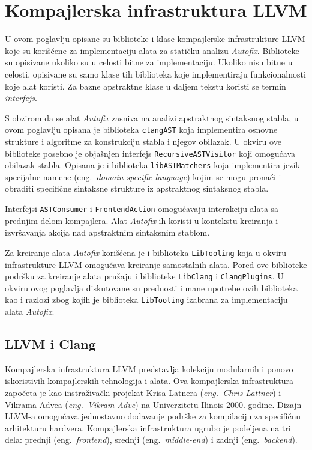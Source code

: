 \documentclass[12pt,oneside]{memoir}
\begin{document}
\chapter{Kompajlerska infrastruktura LLVM}
\label{chp:llvm}

U ovom poglavlju opisane su biblioteke i klase kompajlerske infrastrukture LLVM koje su kori\v{s}\'{c}ene za implementaciju alata za stati\v{c}ku analizu \textit{Autofix}. Biblioteke su opisivane ukoliko su u celosti
bitne za implementaciju. Ukoliko nisu bitne u celosti, opisivane su samo klase tih biblioteka koje implementiraju funkcionalnosti koje alat koristi. Za bazne apstraktne klase u daljem tekstu koristi se termin \textit{interfejs}. \par 
S obzirom da se alat \textit{Autofix} zasniva na analizi apstraktnog sintaksnog stabla, u ovom poglavlju opisana je biblioteka \texttt{clangAST} koja implementira osnovne
strukture i algoritme za konstrukciju stabla i njegov obilazak. U okviru ove biblioteke posebno je obja\v{s}njen interfejs \texttt{RecursiveASTVisitor} koji omogu\'{c}ava obilazak stabla.
Opisana je i biblioteka \texttt{libASTMatchers} koja implementira jezik specijalne namene (eng.~\textit{domain specific language}) kojim se mogu prona\'{c}i i obraditi specifi\v{c}ne sintaksne strukture iz apstraktnog sintaksnog stabla.
\par
Interfejsi \texttt{ASTConsumer} i \texttt{FrontendAction} omogu\'{c}avaju interakciju alata sa prednjim delom kompajlera. Alat \textit{Autofix} ih
koristi u kontekstu kreiranja i izvr\v{s}avanja akcija nad apstraktnim sintaksnim
stablom.
\par
Za kreiranje alata \textit{Autofix} kori\v{s}\'{c}ena je i biblioteka \texttt{LibTooling} koja u okviru infrastrukture LLVM omogu\'{c}ava kreiranje samostalnih alata. Pored ove biblioteke podr\v{s}ku za kreiranje alata pru\v{z}aju i biblioteke
\texttt{LibClang} i \texttt{ClangPlugins}. U okviru ovog poglavlja diskutovane su prednosti i mane upotrebe ovih biblioteka kao i razlozi zbog kojih je biblioteka \texttt{LibTooling} izabrana za implementaciju alata \textit{Autofix}.

\section{LLVM i Clang}

Kompajlerska infrastruktura LLVM predstavlja kolekciju modularnih i ponovo iskoristivih kompajlerskih tehnologija i alata.
Ova kompajlerska infrastruktura zapo\v{c}eta je kao instraživački projekat Krisa Latnera (\textit{eng.~Chris Lattner}) i Vikrama Advea (\textit{eng.~Vikram Adve}) na Univerzitetu Ilinois 2000. godine.
Dizajn LLVM-a omogu\'{c}ava jednostavno dodavanje podr\v{s}ke za kompilaciju za specifi\v{c}nu arhitekturu hardvera. Kompajlerska infrastruktura
ugrubo je podeljena na tri dela: prednji (eng.~\textit{frontend}), srednji (eng.~\textit{middle-end}) i zadnji (eng.~\textit{backend}). 
\end{document}
